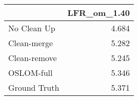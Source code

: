\begin{tabular}{lr}
\toprule
{} & LFR_om_1.40 \\
\midrule
No Clean Up  &       4.684 \\
Clean-merge  &       5.282 \\
Clean-remove &       5.245 \\
OSLOM-full   &       5.346 \\
Ground Truth &       5.371 \\
\bottomrule
\end{tabular}
